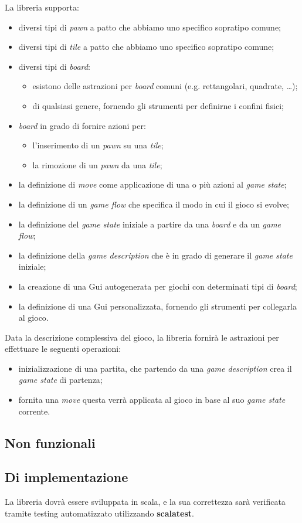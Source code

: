 La libreria supporta:
%
\begin{itemize}
    \item diversi tipi di \textit{pawn} a patto che abbiamo uno specifico sopratipo comune;
    \item diversi tipi di \textit{tile} a patto che abbiamo uno specifico sopratipo comune;
    \item diversi tipi di \textit{board}: 
        \begin{itemize}
            \item esistono delle astrazioni per \textit{board} comuni (e.g. rettangolari, quadrate, \dots);
            \item di qualsiasi genere, fornendo gli strumenti per definirne i confini fisici;
        \end{itemize}
    \item \textit{board} in grado di fornire azioni per:
          \begin{itemize}
              \item l'inserimento di un \textit{pawn} su una \textit{tile};
              \item la rimozione di un \textit{pawn} da una \textit{tile};
          \end{itemize}
    \item la definizione di \textit{move} come applicazione di una o più azioni al \textit{game state};
    \item la definizione di un \textit{game flow} che specifica il modo in cui il gioco si evolve;
    \item la definizione del \textit{game state} iniziale a partire da una \textit{board} e da un \textit{game flow};
    \item la definizione della \textit{game description} che è in grado di generare il \textit{game state} iniziale;
    \item la creazione di una Gui autogenerata per giochi con determinati tipi di \textit{board};
    \item la definizione di una Gui personalizzata, fornendo gli strumenti per collegarla al gioco.
\end{itemize}
%
Data la descrizione complessiva del gioco, la libreria fornirà le astrazioni per effettuare le seguenti operazioni:
%
\begin{itemize}
    \item inizializzazione di una partita, che partendo da una \textit{game description} crea il \textit{game state} di partenza;
    \item fornita una \textit{move} questa verrà applicata al gioco in base al suo \textit{game state} corrente.
\end{itemize}

\subsection{Non funzionali}



\subsection{Di implementazione}

La libreria dovrà essere sviluppata in scala, e la sua correttezza sarà verificata tramite testing automatizzato utilizzando \textbf{scalatest}.